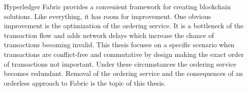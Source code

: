 Hyperledger Fabric provides a convenient framework for creating blockchain solutions. Like everything, it has room for improvement. One obvious improvement is the optimization of the ordering service. It is a bottleneck of the transaction flow and adds network delays which increase the chance of transactions becoming invalid. This thesis focuses on a specific scenario when transactions are conflict-free and commutative by design making the exact order of transactions not important. Under these circumstances the ordering service becomes redundant. Removal of the ordering service and the consequences of an orderless approach to Fabric is the topic of this thesis.

